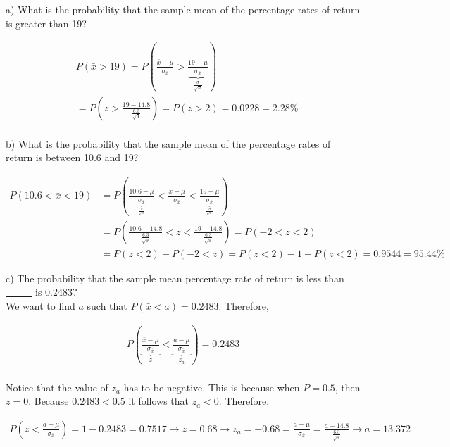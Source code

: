 \documentclass[12pt]{article}
\begin{document}
\begin{enumerate}
{a) What is the probability that the sample mean of the percentage rates of return is greater than 19?

$$
\begin{aligned}
	& P(\bar{x}>19)=P(\frac{\bar{x}-\mu}{\sigma_{\bar{x}}}>\underbrace{\frac{19-\mu}{\sigma_{\bar{x}}}}_{\frac{\sigma}{\sqrt{n}}}) \\
	& =P\left(z>\frac{19-14.8}{\frac{6.3}{\sqrt{9}}}\right)=P(z>2)=0.0228=2.28 \% \\
	&
\end{aligned}
$$

	
b) What is the probability that the sample mean of the percentage rates of return is between 10.6 and 19?

$$
\begin{aligned}
	P(10.6<\bar{x}<19) & =P\left(\frac{10.6-\mu}{\underbrace{\sigma_{\bar{x}}}_{\frac{\sigma}{\sqrt{n}}}}<\frac{\bar{x}-\mu}{\sigma_{\bar{x}}}<\frac{19-\mu}{\underbrace{\sigma_{\bar{x}}}_{\frac{\sigma}{\sqrt{n}}}}\right) \\
	& =P\left(\frac{10.6-14.8}{\frac{6.3}{\sqrt{9}}}<z<\frac{19-14.8}{\frac{6.3}{\sqrt{9}}}\right)=P(-2<z<2) \\
	& =P(z<2)-P(-2<z)=P(z<2)-1+P(z<2)=0.9544=95.44 \%
\end{aligned}
$$


c) The probability that the sample mean percentage rate of return is less than \underline{\,\,\,\,\,\,\,\,\,\,\,\,\,\,\,\,} is 0.2483?\\

We want to find $a$ such that $P(\bar{x}<a)=0.2483$. Therefore,

$$
\begin{array}{r}
	P(\underbrace{\frac{\bar{x}-\mu}{\sigma_{\bar{x}}}}_z<\underbrace{\frac{a-\mu}{\sigma_{\bar{x}}}}_{z_a})=0.2483 \\
\end{array}
$$	

Notice that the value of $z_a$ has to be negative. This is because when $P=0.5$, then $z=0$. Because $0.2483<0.5$ it follows that $z_a<0$. Therefore,
	
$$
\begin{array}{r}	
	P\left(z<\frac{a-\mu}{\sigma_{\bar{x}}}\right)=1-0.2483=0.7517 \rightarrow z=0.68 \rightarrow z_a=-0.68=\frac{a-\mu}{\sigma_{\bar{x}}}=\frac{a-14.8}{\frac{6.3}{\sqrt{9}}} \rightarrow a=13.372
\end{array}
$$




}


\end{enumerate}
\end{document}
